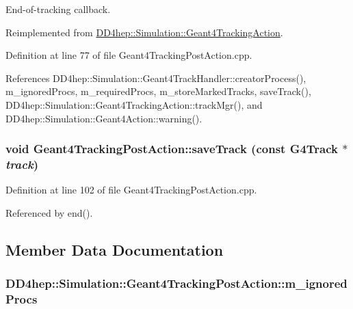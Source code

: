 End-\/of-\/tracking callback. 

Reimplemented from \hyperlink{class_d_d4hep_1_1_simulation_1_1_geant4_tracking_action_a29f980c180576781771ea325b4a73f14}{DD4hep::Simulation::Geant4TrackingAction}.

Definition at line 77 of file Geant4TrackingPostAction.cpp.

References DD4hep::Simulation::Geant4TrackHandler::creatorProcess(), m\_\-ignoredProcs, m\_\-requiredProcs, m\_\-storeMarkedTracks, saveTrack(), DD4hep::Simulation::Geant4TrackingAction::trackMgr(), and DD4hep::Simulation::Geant4Action::warning().\hypertarget{class_d_d4hep_1_1_simulation_1_1_geant4_tracking_post_action_a9ff02148f329e54a340e623d79b1f9c3}{
\subsubsection[{saveTrack}]{\setlength{\rightskip}{0pt plus 5cm}void Geant4TrackingPostAction::saveTrack (const G4Track $\ast$ {\em track})}}
\label{class_d_d4hep_1_1_simulation_1_1_geant4_tracking_post_action_a9ff02148f329e54a340e623d79b1f9c3}


Definition at line 102 of file Geant4TrackingPostAction.cpp.

Referenced by end().

\subsection{Member Data Documentation}
\hypertarget{class_d_d4hep_1_1_simulation_1_1_geant4_tracking_post_action_abf458624a8077fc4533d3c830b9e240f}{
\subsubsection[{m\_\-ignoredProcs}]{ {\bf DD4hep::Simulation::Geant4TrackingPostAction::m\_\-ignoredProcs}}}
\label{class_d_d4hep_1_1_simulation_1_1_geant4_tracking_post_action_abf458624a8077fc4533d3c830b9e240f}


